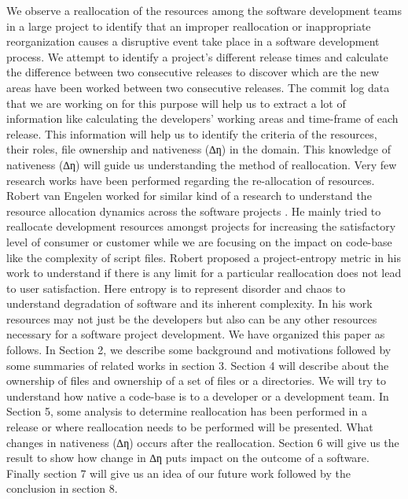\documentclass{acm_proc_article-sp}
\begin{document}
We observe a reallocation of the resources among the software development teams in a large project to identify that an improper reallocation or inappropriate reorganization causes a disruptive event take place in a software development process. We attempt to identify a project’s different release times and calculate the difference between two consecutive releases to discover which are the new areas have been worked between two consecutive releases. The commit log data that we are working on for this purpose will help us to extract a lot of information like calculating the developers' working areas and time-frame of each release. This information will help us to identify the criteria of the resources, their roles, file ownership and nativeness (∆ƞ) in the domain. This knowledge of nativeness (∆ƞ) will guide us understanding the method of reallocation.
Very few research works have been performed regarding the re-allocation of resources.  Robert van Engelen worked for similar kind of a research to understand the resource allocation dynamics across the software projects \cite{datta:pentropy}. He mainly tried to reallocate development resources amongst projects for increasing the satisfactory level of consumer or customer while we are focusing on the impact on code-base like the complexity of script files. Robert proposed a project-entropy metric in his work to understand if there is any limit for a particular reallocation does not lead to user satisfaction. Here entropy is to represent disorder and chaos to understand degradation of software and its inherent complexity. In his work resources may not just be the developers but also can be any other resources necessary for a software project development.
We have organized this paper as follows. In Section 2, we describe some background and motivations followed by some summaries of related works in section 3. Section 4 will describe about the ownership of files and ownership of a set of files or a directories. We will try to understand how native a code-base is to a developer or a development team. In Section 5, some analysis to determine reallocation has been performed in a release or where reallocation needs to be performed will be presented. What changes in nativeness (∆ƞ) occurs after the reallocation. Section 6 will give us the result to show how change in ∆ƞ puts impact on the outcome of a software. Finally section 7 will give us an idea of our future work followed by the conclusion in section 8.
\end{document}
